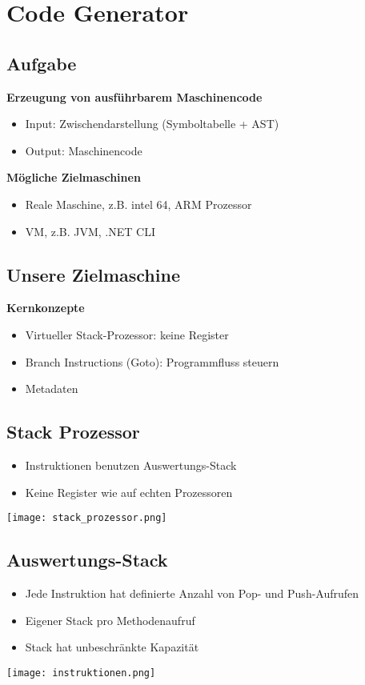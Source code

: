 \section{Code Generator}
\subsection{Aufgabe}
\textbf{Erzeugung von ausführbarem Maschinencode}
\begin{itemize}
    \item Input: Zwischendarstellung (Symboltabelle + AST)
    \item Output: Maschinencode
\end{itemize}
\textbf{Mögliche Zielmaschinen}
\begin{itemize}
    \item Reale Maschine, z.B. intel 64, ARM Prozessor
    \item VM, z.B. JVM, .NET CLI
\end{itemize}

\subsection{Unsere Zielmaschine}
\textbf{Kernkonzepte}
\begin{itemize}
    \item Virtueller Stack-Prozessor: keine Register
    \item Branch Instructions (Goto): Programmfluss steuern
    \item Metadaten
\end{itemize}

\subsection{Stack Prozessor}
\begin{itemize}
    \item Instruktionen benutzen Auswertungs-Stack
    \item Keine Register wie auf echten Prozessoren
\end{itemize}

\texttt{[image: stack\_prozessor.png]}

\subsection{Auswertungs-Stack}
\begin{itemize}
    \item Jede Instruktion hat definierte Anzahl von Pop- und Push-Aufrufen
    \item Eigener Stack pro Methodenaufruf
    \item Stack hat unbeschränkte Kapazität
\end{itemize}
\texttt{[image: instruktionen.png]}

